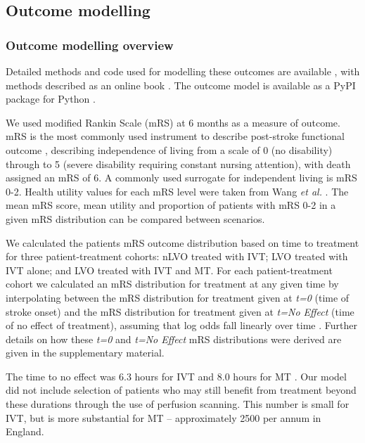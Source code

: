 \subsection{Outcome modelling}

\subsubsection{Outcome modelling overview}

Detailed methods and code used for modelling these outcomes are available \cite{github2}, with methods described as an online book \cite{github3}. The outcome model is available as a PyPI package for Python \cite{pypi}.

We used modified Rankin Scale (mRS) at 6 months as a measure of outcome. mRS is the most commonly used instrument to describe post-stroke functional outcome \cite{quinn_functional_2009}, describing independence of living from a scale of 0 (no disability) through to 5 (severe disability requiring constant nursing attention), with death assigned an mRS of 6. A commonly used surrogate for independent living is  mRS 0-2. Health utility values for each mRS level were taken from Wang \textit{et al.} \cite{wang_utility-weighted_2020}. The mean mRS score, mean utility and proportion of patients with mRS 0-2 in a given mRS distribution can be compared between scenarios.

We calculated the patients mRS outcome distribution based on time to treatment for three patient-treatment cohorts: nLVO treated with IVT; LVO treated with IVT alone; and LVO treated with IVT and MT. For each patient-treatment cohort we calculated an mRS distribution for treatment at any given time by interpolating between the mRS distribution for treatment given at \emph{t=0} (time of stroke onset) and the mRS distribution for treatment given at \emph{t=No Effect} (time of no effect of treatment), assuming that log odds fall linearly over time \cite{emberson_effect_2014, fransen_time_2016}. Further details on how these \emph{t=0} and \emph{t=No Effect} mRS distributions were derived are given in the supplementary material.

The time to no effect was 6.3 hours for IVT \cite{emberson_effect_2014} and 8.0 hours for MT \cite{ fransen_time_2016}. Our model did not include selection of patients who may still benefit from treatment beyond these durations through the use of perfusion scanning. This number is small for IVT, but is more substantial for MT – approximately 2500 per annum in England. 

